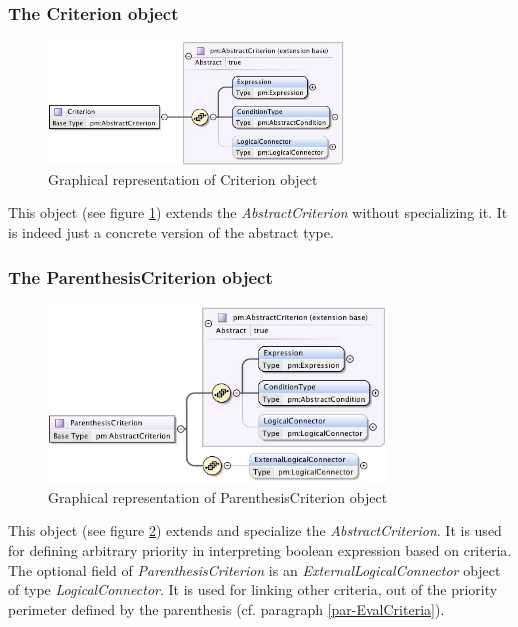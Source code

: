 \documentclass[a4paper,11pt] {ivoa}
\begin{document}
\subsubsection{The Criterion object}
\begin{figure}[htbp]
\begin{center}
\includegraphics[width=0.7\textwidth]{pictures/Criterion.jpg} 
\caption{Graphical representation of Criterion object}
\label{Pic-Criterion}
\end{center}
\end{figure}
This object (see figure \ref{Pic-Criterion}) extends the  {\it AbstractCriterion} without
specializing it. It is indeed just a concrete version of the abstract type.

\subsubsection{The ParenthesisCriterion object}
\begin{figure}[htbp]
\begin{center}
\includegraphics[width=0.8\textwidth]{pictures/ParenthesisCriterion.jpg} 
\caption{Graphical representation of ParenthesisCriterion object}
\label{Pic-ParenthesisCriterion}
\end{center}
\end{figure}
This object (see figure \ref{Pic-ParenthesisCriterion}) extends and specialize the  {\it
AbstractCriterion}. It is used for defining arbitrary priority in interpreting boolean expression
based on criteria.
The optional field of {\it ParenthesisCriterion} is an {\it ExternalLogicalConnector} object
of type {\it LogicalConnector}. It is used for linking other criteria, out of the priority
perimeter defined by the parenthesis (cf.  paragraph \ref{par-EvalCriteria}).
\end{document}
